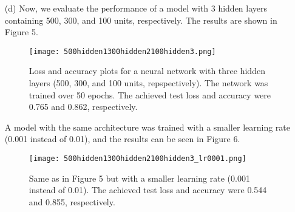 \documentclass[12pt]{article}
\begin{document}
\begin{enumerate}
\begin{figure}[h!]
{        The network was trained over 50 epochs. The achieved test loss and accuracy were 0.635 and 0.865, respectively.}
    \end{figure}
    \item[(d)] Now, we evaluate the performance of a model with 3 hidden layers containing 500, 300, and 100 units, respectively.
    The results are shown in Figure 5.
    \begin{figure}[h!]
        \centering
        \texttt{[image: 500hidden1300hidden2100hidden3.png]}
        \caption{Loss and accuracy plots for a neural network with three hidden layers (500, 300, and 100 units, repspectively). 
        The network was trained over 50 epochs. The achieved test loss and accuracy were 0.765 and 0.862, respectively.}
    \end{figure}
    A model with the same architecture was trained with a smaller learning rate (0.001 instead of 0.01), and the results can be seen in Figure 6.
    \begin{figure}[h!]
        \centering
        \texttt{[image: 500hidden1300hidden2100hidden3\_lr0001.png]}
        \caption{Same as in Figure 5 but with a smaller learning rate (0.001 instead of 0.01). The achieved test loss and accuracy were 0.544 and 0.855, respectively.}
    \end{figure}
\end{enumerate}
\end{document}
